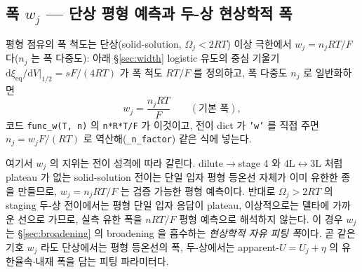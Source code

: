 \documentclass[11pt,a4paper]{article}
\newcommand{\dd}{\mathrm{d}}
\newcommand{\eq}{\mathrm{eq}}
\newcommand{\code}[1]{\texttt{#1}}
\begin{document}
\subsection{폭 $w_j$ — 단상 평형 예측과 두-상 현상학적 폭}
평형 점유의 폭 척도는 단상(solid-solution, $\Omega_j<2RT$) 이상 극한에서 $w_j=n_jRT/F$ 다($n_j$ 는 폭 다중도):
아래 \S\ref{sec:width} logistic 유도의 중심 기울기 $\dd\xi_\eq/\dd V|_{1/2}=sF/(4RT)$ 가 폭 척도 $RT/F$ 를 정의하고,
폭 다중도 $n_j$ 로 일반화하면
\begin{equation}
w_j=\frac{n_jRT}{F}\qquad(\text{기본 폭}),
\label{eq:wbase}
\end{equation}
코드 \code{func\_w(T, n)} 의 \code{n*R*T/F}
가 이것이고, 전이 dict 가 \code{'w'} 를 직접 주면 $n_j=w_jF/(RT)$ 로 역산해(\code{\_n\_factor}) 같은 식에 넣는다.

여기서 $w_j$ 의 지위는 전이 성격에 따라 갈린다. dilute$\to$stage 4 와 $4\mathrm L\leftrightarrow3\mathrm L$ 처럼
plateau 가 없는 solid-solution 전이는 단일 입자 평형 등온선 자체가 이미 유한한 종을 만들므로, $w_j=n_jRT/F$ 는 검증
가능한 평형 예측이다. 반대로 $\Omega_j>2RT$ 의 staging 두-상 전이에서는 평형 단일 입자 응답이 plateau, 이상적으로는
델타에 가까운 선으로 가므로, 실측 유한 폭을 $nRT/F$ 평형 예측으로 해석하지 않는다. 이 경우 $w_j$ 는
\S\ref{sec:broadening} 의 broadening 을 흡수하는 \emph{현상학적 자유 피팅 폭}이다. 곧 같은 기호 $w_j$ 라도
단상에서는 평형 등온선의 폭, 두-상에서는 apparent-$U=U_j+\eta$ 의 유한율속$\cdot$내재 폭을 담는 피팅 파라미터다.
\end{document}
